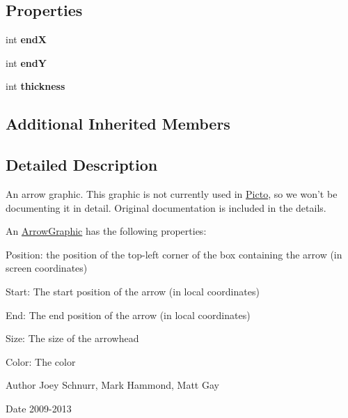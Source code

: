 \subsection*{Properties}
\begin{DoxyCompactItemize}
\item 
\hypertarget{class_picto_1_1_arrow_graphic_abc10f59762ce62a62ecbbc41df1c272d}{int {\bfseries end\-X}}\label{class_picto_1_1_arrow_graphic_abc10f59762ce62a62ecbbc41df1c272d}

\item 
\hypertarget{class_picto_1_1_arrow_graphic_a93952accef2f35b4c59fac3fb6314161}{int {\bfseries end\-Y}}\label{class_picto_1_1_arrow_graphic_a93952accef2f35b4c59fac3fb6314161}

\item 
\hypertarget{class_picto_1_1_arrow_graphic_a143001e1ea4de48e8b07beb7978890b1}{int {\bfseries thickness}}\label{class_picto_1_1_arrow_graphic_a143001e1ea4de48e8b07beb7978890b1}

\end{DoxyCompactItemize}
\subsection*{Additional Inherited Members}


\subsection{Detailed Description}
An arrow graphic. This graphic is not currently used in \hyperlink{namespace_picto}{Picto}, so we won't be documenting it in detail. Original documentation is included in the details. 

An \hyperlink{class_picto_1_1_arrow_graphic}{Arrow\-Graphic} has the following properties\-:
\begin{DoxyItemize}
\item Position\-: the position of the top-\/left corner of the box containing the arrow (in screen coordinates)
\item Start\-: The start position of the arrow (in local coordinates)
\item End\-: The end position of the arrow (in local coordinates)
\item Size\-: The size of the arrowhead
\item Color\-: The color
\end{DoxyItemize}

\begin{DoxyAuthor}{Author}
Joey Schnurr, Mark Hammond, Matt Gay 
\end{DoxyAuthor}
\begin{DoxyDate}{Date}
2009-\/2013 
\end{DoxyDate}



